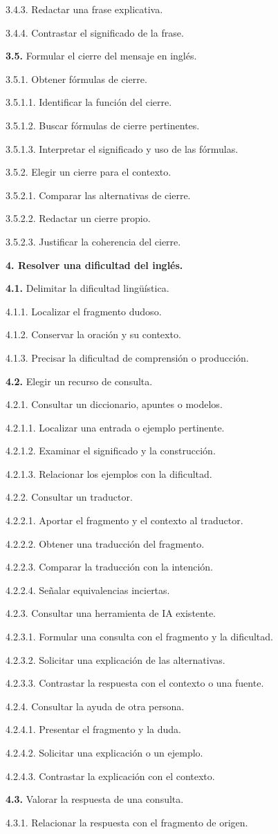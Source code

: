 \documentclass[10pt,a4paper]{article}
\newcommand{\HTAline}[3]{\par\noindent\hspace*{#1cm}\begin{minipage}{\dimexpr\linewidth-#1cm\relax}#3 #2\end{minipage}\par}
\begin{document}
\HTAline{0.8}{3.4.3. Redactar una frase explicativa.}{}
\HTAline{0.8}{3.4.4. Contrastar el significado de la frase.}{}
\HTAline{0.4}{\textbf{3.5.} Formular el cierre del mensaje en inglés.}{}
\HTAline{0.8}{3.5.1. Obtener fórmulas de cierre.}{}
\HTAline{1.2000000000000002}{3.5.1.1. Identificar la función del cierre.}{}
\HTAline{1.2000000000000002}{3.5.1.2. Buscar fórmulas de cierre pertinentes.}{}
\HTAline{1.2000000000000002}{3.5.1.3. Interpretar el significado y uso de las fórmulas.}{}
\HTAline{0.8}{3.5.2. Elegir un cierre para el contexto.}{}
\HTAline{1.2000000000000002}{3.5.2.1. Comparar las alternativas de cierre.}{}
\HTAline{1.2000000000000002}{3.5.2.2. Redactar un cierre propio.}{}
\HTAline{1.2000000000000002}{3.5.2.3. Justificar la coherencia del cierre.}{}
\HTAline{0.0}{\textbf{4. Resolver una dificultad del inglés.}}{}
\HTAline{0.4}{\textbf{4.1.} Delimitar la dificultad lingüística.}{}
\HTAline{0.8}{4.1.1. Localizar el fragmento dudoso.}{}
\HTAline{0.8}{4.1.2. Conservar la oración y su contexto.}{}
\HTAline{0.8}{4.1.3. Precisar la dificultad de comprensión o producción.}{}
\HTAline{0.4}{\textbf{4.2.} Elegir un recurso de consulta.}{}
\HTAline{0.8}{4.2.1. Consultar un diccionario, apuntes o modelos.}{}
\HTAline{1.2000000000000002}{4.2.1.1. Localizar una entrada o ejemplo pertinente.}{}
\HTAline{1.2000000000000002}{4.2.1.2. Examinar el significado y la construcción.}{}
\HTAline{1.2000000000000002}{4.2.1.3. Relacionar los ejemplos con la dificultad.}{}
\HTAline{0.8}{4.2.2. Consultar un traductor.}{}
\HTAline{1.2000000000000002}{4.2.2.1. Aportar el fragmento y el contexto al traductor.}{}
\HTAline{1.2000000000000002}{4.2.2.2. Obtener una traducción del fragmento.}{}
\HTAline{1.2000000000000002}{4.2.2.3. Comparar la traducción con la intención.}{}
\HTAline{1.2000000000000002}{4.2.2.4. Señalar equivalencias inciertas.}{}
\HTAline{0.8}{4.2.3. Consultar una herramienta de IA existente.}{}
\HTAline{1.2000000000000002}{4.2.3.1. Formular una consulta con el fragmento y la dificultad.}{}
\HTAline{1.2000000000000002}{4.2.3.2. Solicitar una explicación de las alternativas.}{}
\HTAline{1.2000000000000002}{4.2.3.3. Contrastar la respuesta con el contexto o una fuente.}{}
\HTAline{0.8}{4.2.4. Consultar la ayuda de otra persona.}{}
\HTAline{1.2000000000000002}{4.2.4.1. Presentar el fragmento y la duda.}{}
\HTAline{1.2000000000000002}{4.2.4.2. Solicitar una explicación o un ejemplo.}{}
\HTAline{1.2000000000000002}{4.2.4.3. Contrastar la explicación con el contexto.}{}
\HTAline{0.4}{\textbf{4.3.} Valorar la respuesta de una consulta.}{}
\HTAline{0.8}{4.3.1. Relacionar la respuesta con el fragmento de origen.}{}
\end{document}
